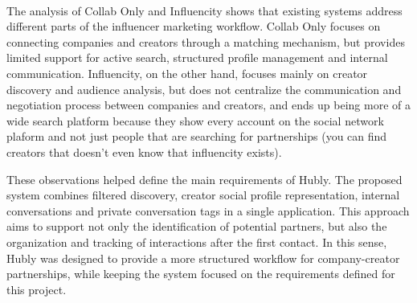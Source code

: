 \paragraph{}The analysis of Collab Only and Influencity shows that existing systems address different parts of the influencer marketing workflow. Collab Only focuses on connecting companies and creators through a matching mechanism, but provides limited support for active search, structured profile management and internal communication. Influencity, on the other hand, focuses mainly on creator discovery and audience analysis, but does not centralize the communication and negotiation process between companies and creators, and ends up being more of a wide search platform because they show every account on the social network plaform and not just people that are searching for partnerships (you can find creators that doesn't even know that influencity exists). 

These observations helped define the main requirements of Hubly. The proposed system combines filtered discovery, creator social profile representation, internal conversations and private conversation tags in a single application. This approach aims to support not only the identification of potential partners, but also the organization and tracking of interactions after the first contact. In this sense, Hubly was designed to provide a more structured workflow for company-creator partnerships, while keeping the system focused on the requirements defined for this project.